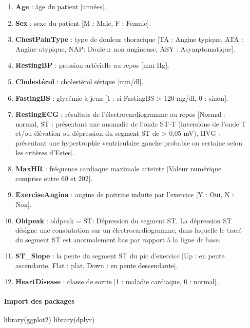 \documentclass[
]{article}
\newenvironment{Shaded}{\begin{snugshade}}{\end{snugshade}}
\newcommand{\FunctionTok}[1]{\textcolor[rgb]{0.00,0.00,0.00}{#1}}
\newcommand{\NormalTok}[1]{#1}
\begin{document}
\begin{enumerate}
\def\labelenumi{\arabic{enumi}.}
\item
  \textbf{Age} : âge du patient {[}années{]}.
\item
  \textbf{Sex} : sexe du patient {[}M : Male, F : Female{]}.
\item
  \textbf{ChestPainType} : type de douleur thoracique {[}TA : Angine
  typique, ATA : Angine atypique, NAP: Douleur non angineuse, ASY :
  Asymptomatique{]}.
\item
  \textbf{RestingBP} : pression artérielle au repos {[}mm Hg{]}.
\item
  \textbf{Cholestérol} : cholestérol sérique {[}mm/dl{]}.
\item
  \textbf{FastingBS} : glycémie à jeun {[}1 : si FastingBS
  \textgreater{} 120 mg/dl, 0 : sinon{]}.
\item
  \textbf{RestingECG} : résultats de l'électrocardiogramme au repos
  {[}Normal : normal, ST : présentant une anomalie de l'onde ST-T
  (inversions de l'onde T et/ou élévation ou dépression du segment ST de
  \textgreater{} 0,05 mV), HVG : présentant une hypertrophie
  ventriculaire gauche probable ou certaine selon les critères
  d'Estes{]}.
\item
  \textbf{MaxHR} : fréquence cardiaque maximale atteinte {[}Valeur
  numérique comprise entre 60 et 202{]}.
\item
  \textbf{ExerciseAngina} : angine de poitrine induite par l'exercice
  {[}Y : Oui, N : Non{]}.
\item
  \textbf{Oldpeak} : oldpeak = ST: Dépression du segment ST. La
  dépression ST désigne une constatation sur un électrocardiogramme,
  dans laquelle le tracé du segment ST est anormalement bas par rapport
  à la ligne de base.
\item
  \textbf{ST\_Slope} : la pente du segment ST du pic d'exercice {[}Up :
  en pente ascendante, Flat : plat, Down : en pente descendante{]}.
\item
  \textbf{HeartDisease} : classe de sortie {[}1 : maladie cardiaque, 0 :
  normal{]}.
\end{enumerate}

\hypertarget{import-des-packages}{%
\paragraph{Import des packages}\label{import-des-packages}}

\begin{Shaded}
\begin{Highlighting}[]
\FunctionTok{library}\NormalTok{(ggplot2)}
\FunctionTok{library}\NormalTok{(dplyr)}
\end{Highlighting}
\end{Shaded}
\end{document}
